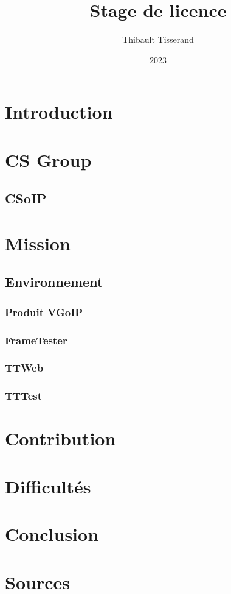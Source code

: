 \documentclass{beamer}
\title{Stage de licence}
\author{Thibault Tisserand}
\institute{Université de Lille}
\date{2023}
\begin{document}
\titlepage



\section{Introduction}


\section{CS Group}


\subsection{CSoIP}


\section{Mission}


\subsection{Environnement}


\subsubsection{Produit VGoIP}


\subsubsection{FrameTester}


\subsubsection{TTWeb}


\subsubsection{TTTest}


\section{Contribution}


\section{Difficultés}


\section{Conclusion}


\section{Sources}

\end{document}
